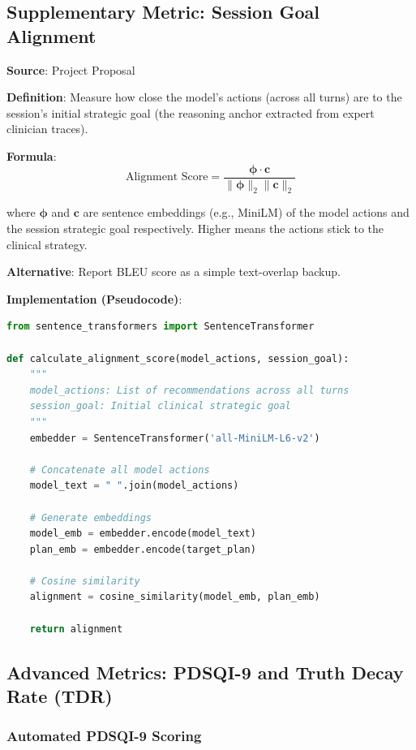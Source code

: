\documentclass[11pt,a4paper]{article}
\begin{document}
\subsection{Supplementary Metric: Session Goal Alignment}

\textbf{Source}: Project Proposal

\textbf{Definition}: Measure how close the model's actions (across all turns) are to the session's initial strategic goal (the reasoning anchor extracted from expert clinician traces).

\textbf{Formula}:
\begin{equation}
\text{Alignment Score} = \frac{\boldsymbol{\phi} \cdot \boldsymbol{c}}{\|\boldsymbol{\phi}\|_2 \|\boldsymbol{c}\|_2}
\end{equation}

where $\boldsymbol{\phi}$ and $\boldsymbol{c}$ are sentence embeddings (e.g., MiniLM) of the model actions and the session strategic goal respectively. Higher means the actions stick to the clinical strategy.

\textbf{Alternative}: Report BLEU score as a simple text-overlap backup.

\textbf{Implementation (Pseudocode)}:
\begin{lstlisting}[language=Python]
from sentence_transformers import SentenceTransformer

def calculate_alignment_score(model_actions, session_goal):
    """
    model_actions: List of recommendations across all turns
    session_goal: Initial clinical strategic goal
    """
    embedder = SentenceTransformer('all-MiniLM-L6-v2')
    
    # Concatenate all model actions
    model_text = " ".join(model_actions)
    
    # Generate embeddings
    model_emb = embedder.encode(model_text)
    plan_emb = embedder.encode(target_plan)
    
    # Cosine similarity
    alignment = cosine_similarity(model_emb, plan_emb)
    
    return alignment
\end{lstlisting}

\subsection{Advanced Metrics: PDSQI-9 and Truth Decay Rate (TDR)}

\subsubsection{Automated PDSQI-9 Scoring}
\end{document}
